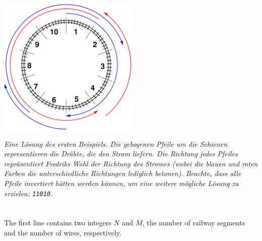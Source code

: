 

\vspace{2mm}
\begin{center}
\includegraphics[width=0.5\textwidth]{alternatingfig.pdf}
\end{center}
\vspace{1mm}

{\em Eine Lösung des ersten Beispiels. Die gebogenen Pfeile um die Schienen representieren die Drähte, die den Strom liefern. Die Richtung jedes Pfeiles repräsentiert Fredriks Wahl der Richtung des Stromes (wobei die blauen und roten Farben die unterschiedliche Richtungen lediglich betonen). Beachte, dass alle Pfeile invertiert hätten werden können, um eine weitere mögliche Lösung zu erzielen: \texttt{11010}.}


\section*{}
The first line contains two integers $N$ and $M$, the number of railway segments and the number of wires, respectively.


